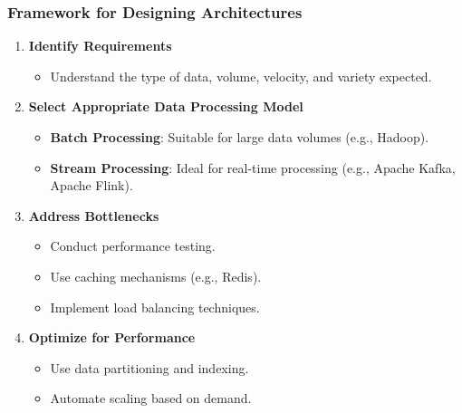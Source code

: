\documentclass[aspectratio=169]{beamer}
\begin{document}
\begin{frame}[fragile]
    \frametitle{Framework for Designing Architectures}
    \begin{enumerate}
        \item \textbf{Identify Requirements}
        \begin{itemize}
            \item Understand the type of data, volume, velocity, and variety expected.
        \end{itemize}

        \item \textbf{Select Appropriate Data Processing Model}
        \begin{itemize}
            \item \textbf{Batch Processing}: Suitable for large data volumes (e.g., Hadoop).
            \item \textbf{Stream Processing}: Ideal for real-time processing (e.g., Apache Kafka, Apache Flink).
        \end{itemize}

        \item \textbf{Address Bottlenecks}
        \begin{itemize}
            \item Conduct performance testing.
            \item Use caching mechanisms (e.g., Redis).
            \item Implement load balancing techniques.
        \end{itemize}

        \item \textbf{Optimize for Performance}
        \begin{itemize}
            \item Use data partitioning and indexing.
            \item Automate scaling based on demand.
        \end{itemize}
    \end{enumerate}
\end{frame}
\end{document}
